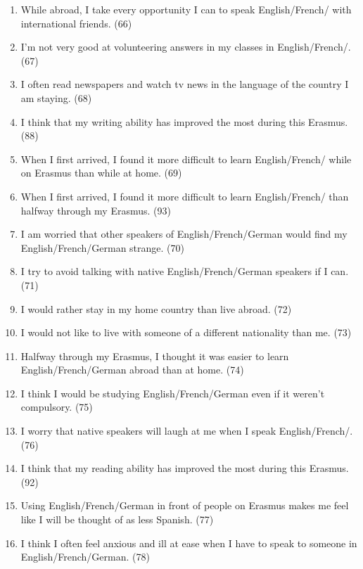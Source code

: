 \documentclass[output=paper]{langsci/langscibook}
\begin{document}
\begin{enumerate}
\item  While abroad, I take every opportunity I can to speak {English}/French/ with international friends. (66)
\item  I’m not very good at volunteering answers in my classes in {English}/French/. (67)
\item  I often read newspapers and watch tv news in the language of the country I am staying. (68)
\item  I think that my writing ability has improved the most during this Erasmus. (88)
\item  When I first arrived, I found it more difficult to learn {English}/French/ while on Erasmus than while at home. (69)
\item  When I first arrived, I found it more difficult to learn {English}/French/ than halfway through my Erasmus. (93)
\item  I am worried that other speakers of {English}/French/{German} would find my {English}/French/{German} strange. (70)
\item  I try to avoid talking with native {English}/French/{German} speakers if I can. (71)
\item  I would rather stay in my home country than live abroad. (72)
\item  I would not like to live with someone of a different nationality than me. (73)
\item  Halfway through my Erasmus, I thought it was easier to learn {English}/\linebreak{}French/{German} abroad than at home. (74)
\item  I think I would be studying {English}/French/{German} even if it weren’t compulsory. (75)
\item  I worry that native speakers will laugh at me when I speak {English}/French/. (76)
\item I think that my reading ability has improved the most during this Erasmus. (92)
\item  Using {English}/French/{German} in front of people on Erasmus makes me feel like I will be thought of as less {Spanish}. (77)
\item  I think I often feel anxious and ill at ease when I have to speak to someone in {English}/French/{German}. (78)

\end{enumerate}
\end{document}
